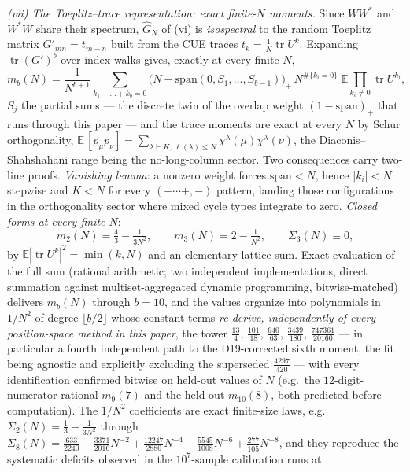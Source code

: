\documentclass[11pt]{article}
\numberwithin{equation}{section}
\theoremstyle{definition}
\theoremstyle{remark}
\begin{document}
\emph{(vii) The Toeplitz--trace representation: exact
finite-$N$ moments.} Since $WW^{*}$ and $W^{*}W$ share their
spectrum, $\widehat G_N$ of (vi) is \emph{isospectral} to the
random Toeplitz matrix $G'_{mn}=t_{m-n}$ built from the CUE
traces $t_k=\frac1N\operatorname{tr}U^{k}$. Expanding
$\operatorname{tr}(G')^{b}$ over index walks gives, exactly at
every finite $N$,
\[
m_b(N)
=\frac1{N^{b+1}}\!\!\sum_{k_1+\dots+k_b=0}\!\!
\bigl(N-\mathrm{span}(0,S_1,\dots,S_{b-1})\bigr)_{+}\,
N^{\#\{k_i=0\}}\;
\mathbb E\!\!\prod_{k_i\neq0}\!\operatorname{tr}U^{k_i},
\]
$S_j$ the partial sums --- the discrete twin of the overlap
weight $(1-\mathrm{span})_+$ that runs through this paper ---
and the trace moments are exact at every $N$ by Schur
orthogonality,
$\mathbb E\,[p_\mu\overline{p_\nu}]
=\sum_{\lambda\vdash K,\,\ell(\lambda)\le N}
\chi^{\lambda}(\mu)\chi^{\lambda}(\nu)$, the
Diaconis--Shahshahani range being the no-long-column sector.
Two consequences carry two-line proofs. \emph{Vanishing
lemma}: a nonzero weight forces $\mathrm{span}<N$, hence
$|k_i|<N$ stepwise and $K<N$ for every
$(+\cdots+,-)$ pattern, landing those configurations in the
orthogonality sector where mixed cycle types integrate to
zero. \emph{Closed forms at every finite $N$}:
\[
m_2(N)=\tfrac43-\tfrac1{3N^{2}},\qquad
m_3(N)=2-\tfrac1{N^{2}},\qquad
\Sigma_3(N)\equiv0,
\]
by $\mathbb E|\operatorname{tr}U^{k}|^{2}=\min(k,N)$ and an
elementary lattice sum. Exact evaluation of the full sum
(rational arithmetic; two independent implementations, direct
summation against multiset-aggregated dynamic programming,
bitwise-matched) delivers $m_b(N)$ through $b=10$, and the
values organize into polynomials in $1/N^{2}$ of degree
$\lfloor b/2\rfloor$ whose constant terms \emph{re-derive,
independently of every position-space method in this paper},
the tower $\tfrac{13}4$, $\tfrac{101}{18}$, $\tfrac{640}{63}$,
$\tfrac{3439}{180}$, $\tfrac{747361}{20160}$ --- in
particular a fourth independent path to the D19-corrected
sixth moment, the fit being agnostic and explicitly excluding
the superseded $\tfrac{4297}{420}$ --- with every
identification confirmed bitwise on held-out values of $N$
(e.g.\ the $12$-digit-numerator rational $m_9(7)$ and the
held-out $m_{10}(8)$, both predicted before computation). The
$1/N^{2}$ coefficients are exact finite-size laws, e.g.
$\Sigma_2(N)=\tfrac13-\tfrac1{3N^{2}}$ through
$\Sigma_8(N)=\tfrac{633}{2240}-\tfrac{3371}{2016}N^{-2}
+\tfrac{12247}{2880}N^{-4}-\tfrac{5545}{1008}N^{-6}
+\tfrac{277}{105}N^{-8}$, and they reproduce the systematic
deficits observed in the $10^{7}$-sample calibration runs at
\end{document}
